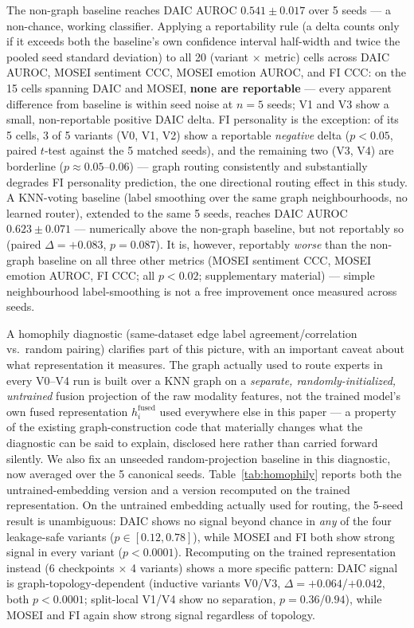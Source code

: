 \documentclass[letterpaper]{article}
\begin{document}
The non-graph baseline reaches DAIC AUROC $0.541 \pm 0.017$ over 5 seeds — a non-chance, working classifier. Applying a reportability rule (a delta counts only if it exceeds both the baseline's own confidence interval half-width and twice the pooled seed standard deviation) to all 20 (variant $\times$ metric) cells across DAIC AUROC, MOSEI sentiment CCC, MOSEI emotion AUROC, and FI CCC: on the 15 cells spanning DAIC and MOSEI, \textbf{none are reportable} — every apparent difference from baseline is within seed noise at $n{=}5$ seeds; V1 and V3 show a small, non-reportable positive DAIC delta. FI personality is the exception: of its 5 cells, 3 of 5 variants (V0, V1, V2) show a reportable \emph{negative} delta ($p<0.05$, paired $t$-test against the 5 matched seeds), and the remaining two (V3, V4) are borderline ($p\approx0.05$–$0.06$) — graph routing consistently and substantially degrades FI personality prediction, the one directional routing effect in this study. A KNN-voting baseline (label smoothing over the same graph neighbourhoods, no learned router), extended to the same 5 seeds, reaches DAIC AUROC $0.623 \pm 0.071$ — numerically above the non-graph baseline, but not reportably so (paired $\Delta{=}{+}0.083$, $p{=}0.087$). It is, however, reportably \emph{worse} than the non-graph baseline on all three other metrics (MOSEI sentiment CCC, MOSEI emotion AUROC, FI CCC; all $p<0.02$; supplementary material) — simple neighbourhood label-smoothing is not a free improvement once measured across seeds.

A homophily diagnostic (same-dataset edge label agreement/correlation vs.\ random pairing) clarifies part of this picture, with an important caveat about what representation it measures. The graph actually used to route experts in every V0--V4 run is built over a KNN graph on a \emph{separate, randomly-initialized, untrained} fusion projection of the raw modality features, not the trained model's own fused representation $h_i^{\text{fused}}$ used everywhere else in this paper — a property of the existing graph-construction code that materially changes what the diagnostic can be said to explain, disclosed here rather than carried forward silently. We also fix an unseeded random-projection baseline in this diagnostic, now averaged over the 5 canonical seeds. Table~\ref{tab:homophily} reports both the untrained-embedding version and a version recomputed on the trained representation. On the untrained embedding actually used for routing, the 5-seed result is unambiguous: DAIC shows no signal beyond chance in \emph{any} of the four leakage-safe variants ($p \in [0.12, 0.78]$), while MOSEI and FI both show strong signal in every variant ($p<0.0001$). Recomputing on the trained representation instead (6 checkpoints $\times$ 4 variants) shows a more specific pattern: DAIC signal is graph-topology-dependent (inductive variants V0/V3, $\Delta{=}{+}0.064$/$+0.042$, both $p<0.0001$; split-local V1/V4 show no separation, $p{=}0.36$/$0.94$), while MOSEI and FI again show strong signal regardless of topology.
\end{document}
